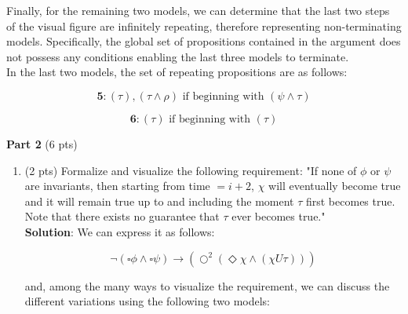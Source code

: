 \documentclass[12pt]{article}
\begin{document}
\begin{spacing}{1.5}
\begin{enumerate}
		      Finally, for the remaining two models, we can determine that the last two steps of the visual figure are infinitely repeating, therefore representing non-terminating models. Specifically, the global set of propositions contained in the argument does not possess any conditions enabling the last three models to terminate.\\
		      		      		      		      		      		      
		      In the last two models, the set of repeating propositions are as follows:
		      		      		      		      		      		      
		      $$\textbf{5}: (\tau), (\tau \land \rho) \text{ if beginning with } (\psi \land \tau)$$
		      		      		      		      		      		      
		      $$\textbf{6}: (\tau) \text{ if beginning with } (\tau)$$
		      		      		      		      		      		      		              
	\end{enumerate}
						
	\textbf{Part 2} (6 pts)
						
	\begin{enumerate}
		\item (2 pts) Formalize and visualize the following requirement: "If none of $\phi$ or $\psi$ are invariants, then starting from time $=i+2$, $\chi$ will eventually become true and it will remain true up to and including the moment $\tau$ first becomes true. Note that there exists no guarantee that $\tau$ ever becomes true."\\
		      		      		      		      		      		      
		      \textbf{Solution}: We can express it as follows:
		      		      		      		      		      		      
		      $$\neg(\square \phi \land \square \psi)\rightarrow (\bigcirc^2 (\Diamond \chi \land (\chi U \tau)))$$
		      		      		      		      		      		      
		      and, among the many ways to visualize the requirement, we can discuss the different variations using the following two models:
		      		      		      		      		      		              
		      \begin{center}
\end{center}
\end{enumerate}
\end{spacing}
\end{document}
